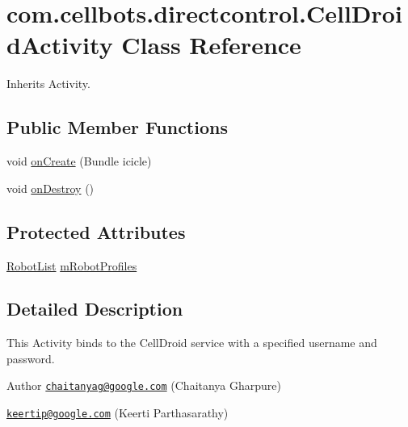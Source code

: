 \hypertarget{classcom_1_1cellbots_1_1directcontrol_1_1_cell_droid_activity}{\section{com.\-cellbots.\-directcontrol.\-Cell\-Droid\-Activity Class Reference}
\label{classcom_1_1cellbots_1_1directcontrol_1_1_cell_droid_activity}
}


Inherits Activity.

\subsection*{Public Member Functions}
\begin{DoxyCompactItemize}
\item 
void \hyperlink{classcom_1_1cellbots_1_1directcontrol_1_1_cell_droid_activity_a4b23ad4d063cdae0318eeb4060b58163}{on\-Create} (Bundle icicle)
\item 
void \hyperlink{classcom_1_1cellbots_1_1directcontrol_1_1_cell_droid_activity_a5fa13726b7b89404baccaebaebcf8628}{on\-Destroy} ()
\end{DoxyCompactItemize}
\subsection*{Protected Attributes}
\begin{DoxyCompactItemize}
\item 
\hyperlink{classcom_1_1cellbots_1_1_robot_list}{Robot\-List} \hyperlink{classcom_1_1cellbots_1_1directcontrol_1_1_cell_droid_activity_a24ead98c88dbca3df6d4b280740cd7f1}{m\-Robot\-Profiles}
\end{DoxyCompactItemize}


\subsection{Detailed Description}
This Activity binds to the Cell\-Droid service with a specified username and password.

\begin{DoxyAuthor}{Author}
\href{mailto:chaitanyag@google.com}{\tt chaitanyag@google.\-com} (Chaitanya Gharpure) 

\href{mailto:keertip@google.com}{\tt keertip@google.\-com} (Keerti Parthasarathy) 
\end{DoxyAuthor}


